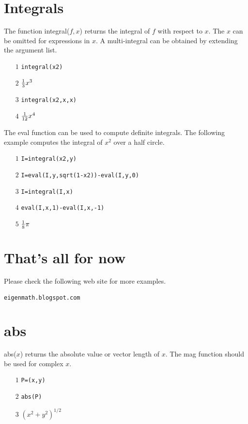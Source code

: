 \documentclass[12pt,openany]{report}
\begin{document}
\newpage

\label{integral}

\section*{Integrals}
The function integral($f,x$) returns the integral of $f$ with respect to $x$.
The $x$ can be omitted for expressions in $x$.
A multi-integral can be obtained by extending the argument list.
\begin{itemize}
\item[$\scriptstyle1$]{\tt integral(x{}2)}
\item[$\scriptstyle2$]\hspace{50pt} ${1\over3}x^3$
\item[$\scriptstyle3$]{\tt integral(x{}2,x,x)}
\item[$\scriptstyle4$]\hspace{50pt} ${1\over12}x^4$
\end{itemize}
The eval function can be used to compute definite integrals.
The following example computes the integral of $x^2$
over a half circle.
\begin{itemize}
\item[$\scriptstyle1$]{\tt I=integral(x{}2,y)}
\item[$\scriptstyle2$]{\tt I=eval(I,y,sqrt(1-x{}2))-eval(I,y,0)}
\item[$\scriptstyle3$]{\tt I=integral(I,x)}
\item[$\scriptstyle4$]{\tt eval(I,x,1)-eval(I,x,-1)}
\item[$\scriptstyle5$]\hspace{50pt} ${1\over8}\pi$
\end{itemize}

\newpage

\section*{That's all for now}
Please check the following web site for more examples.

\medskip
{\tt eigenmath.blogspot.com}

\newpage

\section*{abs}
abs($x$) returns the absolute value or vector length of $x$.
The mag function should be used for complex $x$.
\begin{itemize}
\item[$\scriptstyle1$]{\tt P=(x,y)}
\item[$\scriptstyle2$]{\tt abs(P)}
\item[$\scriptstyle3$]\hspace{50pt} $(x^2+y^2)^{1/2}$
\end{itemize}
\end{document}
